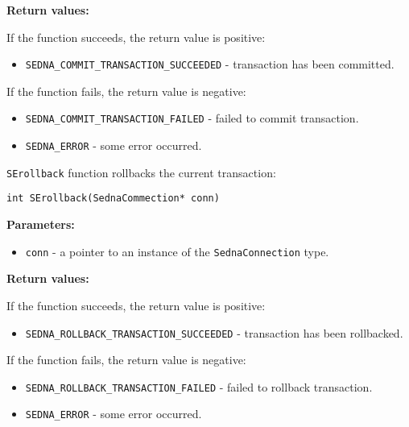 \documentclass[a4paper,12pt]{article}
\newenvironment{citemize}
{\begin{itemize}
  \setlength{\itemsep}{0pt}
  \setlength{\parskip}{0pt}
  \setlength{\parsep}{0pt}}
{\end{itemize}}
\begin{document}
\noindent
\textbf{Return values:}

\medskip

\noindent
If the function succeeds, the return value is positive:

\begin{citemize}
\item\verb!SEDNA_COMMIT_TRANSACTION_SUCCEEDED! - transaction has been committed.
\end{citemize}

\noindent
If the function fails, the return value is negative:

\begin{citemize}
\item\verb!SEDNA_COMMIT_TRANSACTION_FAILED! - failed to commit transaction.
\item\verb!SEDNA_ERROR! - some error occurred.
\end{citemize}

\verb!SErollback! function rollbacks the current transaction:

\begin{verbatim}
int SErollback(SednaCommection* conn)
\end{verbatim}

\noindent
\textbf{Parameters:}

\begin{citemize}
\item\verb!conn! - a pointer to an instance of the \verb!SednaConnection! type.
\end{citemize}

\noindent
\textbf{Return values:}

\medskip

\noindent
If the function succeeds, the return value is positive:

\begin{citemize}
\item\verb!SEDNA_ROLLBACK_TRANSACTION_SUCCEEDED! - transaction has been
rollbacked.
\end{citemize}

\noindent
If the function fails, the return value is negative:

\begin{citemize}
\item\verb!SEDNA_ROLLBACK_TRANSACTION_FAILED! - failed to rollback transaction.
\item\verb!SEDNA_ERROR! - some error occurred.
\end{citemize}


\end{document}

